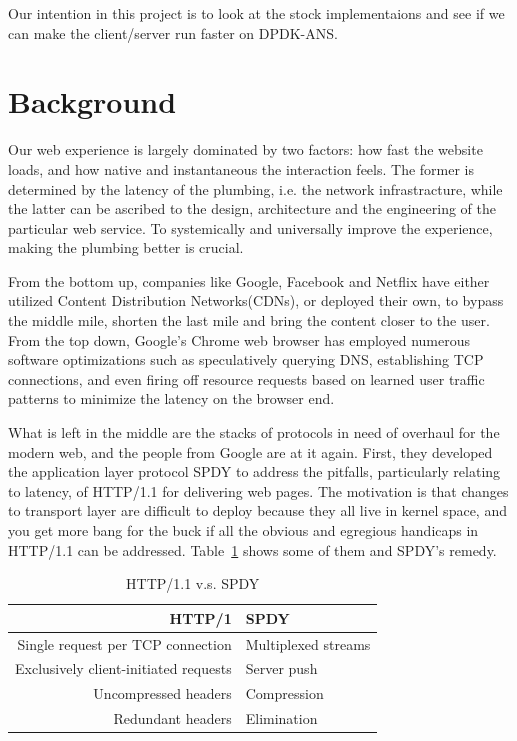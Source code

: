 \documentclass{sig-alternate-05-2015}
\begin{document}
Our intention in this project is to look at the stock implementaions and see if we can make the client/server run faster on DPDK-ANS.

\section{Background}
Our web experience is largely dominated by two factors: how fast the website loads, and how native and instantaneous the interaction feels. The former is determined by the latency of the plumbing, i.e. the network infrastracture, while the latter can be ascribed to the design, architecture and the engineering of the particular web service. To systemically and universally improve the experience, making the plumbing better is crucial. 

From the bottom up, companies like Google, Facebook and Netflix have either utilized Content Distribution Networks(CDNs), or deployed their own, to bypass the middle mile, shorten the last mile and bring the content closer to the user. From the top down, Google's Chrome web browser has employed numerous software optimizations such as speculatively querying DNS, establishing TCP connections, and even firing off resource requests based on learned user traffic patterns to minimize the latency on the browser end.\cite{grigorik:chrome} 

What is left in the middle are the stacks of protocols in need of overhaul for the modern web, and the people from Google are at it again. First, they developed the application layer protocol SPDY to address the pitfalls, particularly relating to latency, of HTTP/1.1 for delivering web pages. The motivation is that changes to transport layer are difficult to deploy because they all live in kernel space, and you get more bang for the buck if all the obvious and egregious handicaps in HTTP/1.1 can be addressed. Table~\ref{tab:httpvspdy} shows some of them and SPDY's remedy.

\vspace*{-10pt}
\begin{table}[h]
\centering
\caption{HTTP/1.1 v.s. SPDY\cite{spdy}}
\label{tab:httpvspdy}
\begin{tabular}{|r|l|}
\hline
HTTP/1 & SPDY \\ \hline
Single request per TCP connection & Multiplexed streams \\ \hline
Exclusively client-initiated requests & Server push \\ \hline
Uncompressed headers & Compression \\ \hline
Redundant headers & Elimination \\ \hline
\end{tabular}
\end{table}
\end{document}
